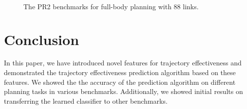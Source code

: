 \documentclass[letterpaper, 10 pt, conference]{ieeeconf}  %
\begin{document}
\begin{figure}[t]
\centering
{}
 \\
\caption{The PR2 benchmarks for full-body planning with 88 links.}
\label{fig:benchmarks3}
\end{figure}




\section{Conclusion}
In this paper, we have introduced novel features for trajectory effectiveness and demonstrated the trajectory effectiveness prediction algorithm based on these features. We showed the the accuracy of the prediction algorithm on different planning tasks in various benchmarks. Additionally, we showed initial results on transferring the learned classifier to other benchmarks.
\end{document}
